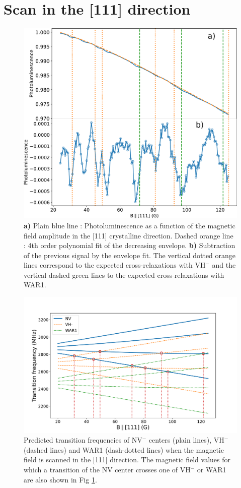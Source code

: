 \documentclass[9pt,twocolumn,twoside]{revtex4-1}
\begin{document}
\section{Scan in the [111] direction}
\begin{figure}
\includegraphics[width=\linewidth]{scan_111_PL}
\caption{\textbf{a)} Plain blue line : Photoluminescence as a function of the magnetic field amplitude in the [111] crystalline direction. Dashed orange line : 4th order polynomial fit of the decreasing envelope. \textbf{b)} Subtraction of the previous signal by the envelope fit. The vertical dotted orange lines correspond to the expected cross-relaxations with VH$^-$ and the vertical dashed green lines to the expected cross-relaxations with WAR1.}\label{scan_PL}
\end{figure}

\begin{figure}
\includegraphics[width=\linewidth]{Transis_111_VHWAR}
\caption{Predicted transition frequencies of NV$^-$ centers (plain lines), VH$^-$ (dashed lines) and WAR1 (dash-dotted lines) when the magnetic field is scanned in the [111] direction. The magnetic field values for which  a transition of the NV center crosses one of VH$^-$ or WAR1 are also shown in Fig \ref{scan_PL}.}\label{transis_VHWAR}
\end{figure}
\end{document}
